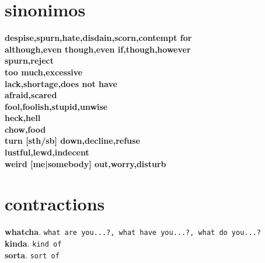 \documentclass[twocolumn]{article}
\begin{document}
  \newpage
  \section{sinonimos}
  \textbf{despise,spurn,hate,disdain,scorn,contempt for}\\
  \textbf{although,even though,even if,though,however}\\
  \textbf{spurn,reject}\\
  \textbf{too much,excessive}\\
  \textbf{lack,shortage,does not have}\\
  \textbf{afraid,scared}\\
  \textbf{fool,foolish,stupid,unwise}\\
  \textbf{heck,hell}\\
  \textbf{chow,food}\\
  \textbf{turn [sth/sb] down,decline,refuse}\\
  \textbf{lustful,lewd,indecent}\\
  \textbf{weird [me|somebody] out,worry,disturb}\\

  \newpage
  \section{contractions}
  \textbf{whatcha}. \texttt{what are you...?, what have you...?, what do you...?}\\
  \textbf{kinda}. \texttt{kind of}\\
  \textbf{sorta}. \texttt{sort of}\\
\end{document}
